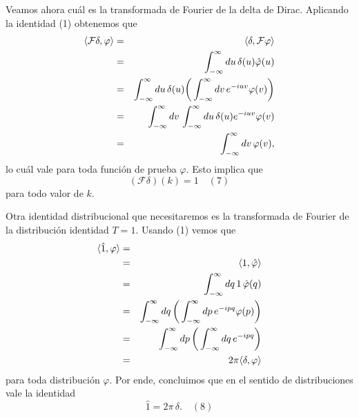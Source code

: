 \documentclass[11pt,spanish]{article}
\newcommand{\four}{\mathcal{F}}
\begin{document}
Veamos ahora cu\'al es la transformada de Fourier de la delta de Dirac.
Aplicando la identidad (1) obtenemos que
\begin{eqnarray}
\langle \four \delta , \varphi \rangle
&=&
\langle \delta , \four \varphi \rangle
\notag
\\
&=&
\int_{-\infty}^{\infty}
du\, 
\delta(u) 
\hat{\varphi}(u)
\notag
\\
&=&
\int_{-\infty}^{\infty} 
du\, 
\delta(u) 
\bigg(
\int_{-\infty}^{\infty} 
dv\,
e^{-iuv}
\varphi(v)
\bigg)
\notag
\\
&=&
\int_{-\infty}^{\infty} 
dv\,
\int_{-\infty}^{\infty} 
du\, 
\delta(u) 
e^{-iuv}
\varphi(v)
\notag
\\
&=&
\int_{-\infty}^{\infty} 
dv\,
\varphi(v),
\notag
\end{eqnarray}
lo cu\'al vale para toda funci\'on de prueba $\varphi$.
Esto implica que
$$
(\four \delta)(k)
=
1
\quad (7)
$$
para todo valor de $k$.

Otra identidad distribucional que necesitaremos es la transformada de Fourier de la distribuci\'on identidad $T=1$.
Usando (1) vemos que
\begin{eqnarray}
\langle \hat{1},\varphi \rangle
&=&
\notag
\\
&=&
\langle 1,\hat{\varphi} \rangle
\notag
\\
&=&
\int_{-\infty}^{\infty}
dq\,
1\,
\hat{\varphi}(q)
\notag
\\
&=&
\int_{-\infty}^{\infty}
dq\,
\bigg(
\int_{-\infty}^{\infty}
dp\,
e^{-ipq}
\varphi(p)
\bigg)
\notag
\\
&=&
\int_{-\infty}^{\infty}
dp\,
\bigg(
\int_{-\infty}^{\infty}
dq\,
e^{-ipq}
\bigg)
\notag
\\
&=&
2\pi
\langle \delta , \varphi \rangle
\notag
\end{eqnarray}
para toda distribuci\'on $\varphi$.
Por ende, concluimos que en el sentido de distribuciones vale la identidad
$$
\hat{1} 
=
2\pi\,
\delta.
\quad (8)
$$
\end{document}
